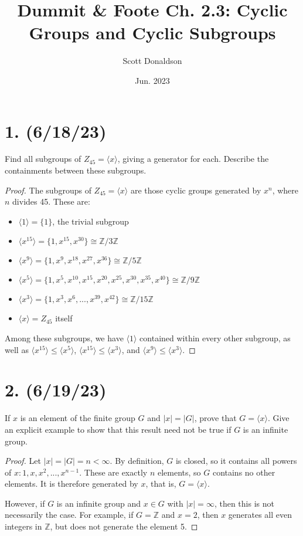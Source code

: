 \documentclass{article}
\title{Dummit \& Foote Ch. 2.3: Cyclic Groups and Cyclic Subgroups}
\author{Scott Donaldson}
\date{Jun. 2023}
\begin{document}
\maketitle

\section*{1. (6/18/23)}

Find all subgroups of $Z_{45} = \langle x \rangle$, giving a generator for each. Describe the containments between these subgroups.

\begin{proof}
    The subgroups of $Z_{45} = \langle x \rangle$ are those cyclic groups generated by $x^n$, where $n$ divides 45. These are:
    \begin{itemize}[itemsep=0em]
        \item $\langle 1 \rangle = \{ 1 \}$, the trivial subgroup
        \item $\langle x^{15} \rangle = \{ 1, x^{15}, x^{30} \} \cong \mathbb{Z}/3\mathbb{Z}$
        \item $\langle x^9 \rangle = \{ 1, x^9, x^{18}, x^{27}, x^{36} \} \cong \mathbb{Z}/5\mathbb{Z}$
        \item $\langle x^5 \rangle = \{ 1, x^5, x^{10}, x^{15}, x^{20}, x^{25}, x^{30}, x^{35}, x^{40} \} \cong \mathbb{Z}/9\mathbb{Z}$
        \item $\langle x^3 \rangle = \{ 1, x^3, x^6, ..., x^{39}, x^{42} \} \cong \mathbb{Z}/15\mathbb{Z}$
        \item $\langle x \rangle = Z_{45}$ itself
    \end{itemize}
    Among these subgroups, we have $\langle 1 \rangle$ contained within every other subgroup, as well as $\langle x^{15} \rangle \leq \langle x^5 \rangle$, $\langle x^{15} \rangle \leq \langle x^3 \rangle$, and $\langle x^9 \rangle \leq \langle x^3 \rangle$.
\end{proof}

\section*{2. (6/19/23)}

If $x$ is an element of the finite group $G$ and $|x| = |G|$, prove that $G = \langle x \rangle$. Give an explicit example to show that this result need not be true if $G$ is an infinite group.

\begin{proof}
    Let $|x| = |G| = n < \infty$. By definition, $G$ is closed, so it contains all powers of $x: 1, x, x^2, ..., x^{n - 1}$. These are exactly $n$ elements, so $G$ contains no other elements. It is therefore generated by $x$, that is, $G = \langle x \rangle$.

    However, if $G$ is an infinite group and $x \in G$ with $|x| = \infty$, then this is not necessarily the case. For example, if $G = \mathbb{Z}$ and $x = 2$, then $x$ generates all even integers in $\mathbb{Z}$, but does not generate the element 5.
\end{proof}
\end{document}
